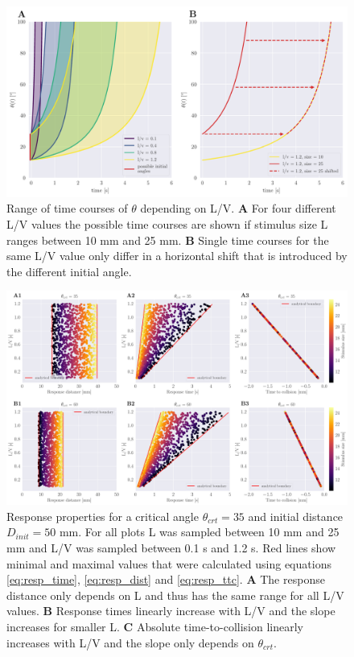 \documentclass[a4paper,10pt,hidelinks]{scrreprt}
\begin{document}
    \begin{figure}[H]
    	\begin{center}
			\includegraphics[width=\textwidth]{figure_theta_lv_test.pdf}
    	\end{center}
    	\caption{Range of time courses of $\theta$ depending on L/V. \textbf{A} For four different L/V values the possible time courses are shown if stimulus size L ranges between 10 mm and 25 mm. \textbf{B} Single time courses for the same L/V value only differ in a horizontal shift that is introduced by the different initial angle.}
    	\label{fig:theta_lv}
    \end{figure}
    
    \begin{figure}[H]
    	\begin{center}
			\includegraphics[width=\textwidth]{figure_ideal_resp_v2.pdf}
    	\end{center}
    	\caption{Response properties for a critical angle $\theta_{crt}=35$ and initial distance $D_{init}=50$ mm.  For all plots L was sampled between 10 mm and 25 mm and L/V was sampled between 0.1 s and 1.2 s. Red lines show minimal and maximal values that were calculated using equations \ref{eq:resp_time}, \ref{eq:resp_dist} and \ref{eq:resp_ttc}. \textbf{A} The response distance only depends on L and thus has the same range for all L/V values. \textbf{B} Response times linearly increase with L/V and the slope increases for smaller L. \textbf{C} Absolute time-to-collision linearly increases with L/V and the slope only depends on $\theta_{crt}$.}
    	\label{fig:ideal_resp_props}
    \end{figure}
		
\end{document}
